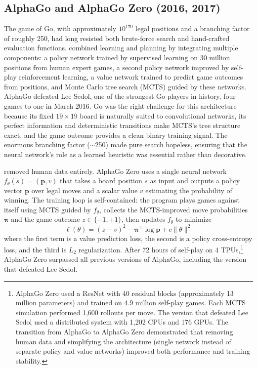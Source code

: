 \subsection{AlphaGo and AlphaGo Zero (2016, 2017)}

The game of Go, with approximately $10^{170}$ legal positions and a branching factor of roughly 250, had long resisted both brute-force search and hand-crafted evaluation functions. \citet{Silver2016} combined learning and planning by integrating multiple components: a policy network trained by supervised learning on 30 million positions from human expert games, a second policy network improved by self-play reinforcement learning, a value network trained to predict game outcomes from positions, and Monte Carlo tree search (MCTS) guided by these networks. AlphaGo defeated Lee Sedol, one of the strongest Go players in history, four games to one in March 2016. Go was the right challenge for this architecture because its fixed $19 \times 19$ board is naturally suited to convolutional networks, its perfect information and deterministic transitions make MCTS's tree structure exact, and the game outcome provides a clean binary training signal. The enormous branching factor ($\sim$250) made pure search hopeless, ensuring that the neural network's role as a learned heuristic was essential rather than decorative.

\citet{Silver2017} removed human data entirely. AlphaGo Zero uses a single neural network $f_\theta(s) = (\mathbf{p}, v)$ that takes a board position $s$ as input and outputs a policy vector $\mathbf{p}$ over legal moves and a scalar value $v$ estimating the probability of winning. The training loop is self-contained: the program plays games against itself using MCTS guided by $f_\theta$, collects the MCTS-improved move probabilities $\boldsymbol{\pi}$ and the game outcome $z \in \{-1, +1\}$, then updates $f_\theta$ to minimize
\begin{equation}
\ell(\theta) = (z - v)^2 - \boldsymbol{\pi}^\top \log \mathbf{p} + c \|\theta\|^2
\end{equation}
where the first term is a value prediction loss, the second is a policy cross-entropy loss, and the third is $L_2$ regularization. After 72 hours of self-play on 4 TPUs,\footnote{AlphaGo Zero used a ResNet with 40 residual blocks (approximately 13 million parameters) and trained on 4.9 million self-play games. Each MCTS simulation performed 1{,}600 rollouts per move. The version that defeated Lee Sedol used a distributed system with 1{,}202 CPUs and 176 GPUs. The transition from AlphaGo to AlphaGo Zero demonstrated that removing human data and simplifying the architecture (single network instead of separate policy and value networks) improved both performance and training stability.} AlphaGo Zero surpassed all previous versions of AlphaGo, including the version that defeated Lee Sedol.

